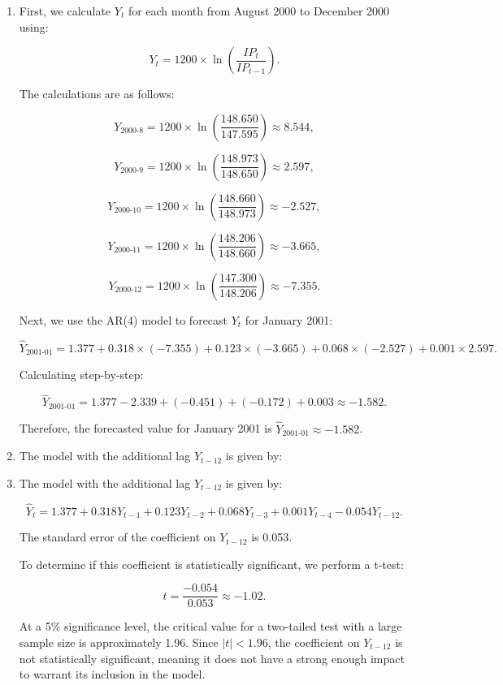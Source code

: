 \documentclass[12pt]{article}
\begin{document}
\begin{enumerate}
{\begin{enumerate}
    \item  First, we calculate \( Y_t \) for each month from August 2000 to December 2000 using:

    \[
    Y_t = 1200 \times \ln\left(\frac{IP_t}{IP_{t-1}}\right).
    \]

    The calculations are as follows:

    \[
    Y_{\text{2000-8}} = 1200 \times \ln\left(\frac{148.650}{147.595}\right) \approx 8.544,
    \]

    \[
    Y_{\text{2000-9}} = 1200 \times \ln\left(\frac{148.973}{148.650}\right) \approx 2.597,
    \]

    \[
    Y_{\text{2000-10}} = 1200 \times \ln\left(\frac{148.660}{148.973}\right) \approx -2.527,
    \]

    \[
    Y_{\text{2000-11}} = 1200 \times \ln\left(\frac{148.206}{148.660}\right) \approx -3.665,
    \]

    \[
    Y_{\text{2000-12}} = 1200 \times \ln\left(\frac{147.300}{148.206}\right) \approx -7.355.
    \]

    Next, we use the AR(4) model to forecast \( Y_t \) for January 2001:

    \[
    \hat{Y}_{\text{2001-01}} = 1.377 + 0.318 \times (-7.355) + 0.123 \times (-3.665) + 0.068 \times (-2.527) + 0.001 \times 2.597.
    \]

    Calculating step-by-step:

    \[
    \hat{Y}_{\text{2001-01}} = 1.377 - 2.339 + (-0.451) + (-0.172) + 0.003 \approx -1.582.
    \]

    Therefore, the forecasted value for January 2001 is \( \hat{Y}_{\text{2001-01}} \approx -1.582 \).

    \item The model with the additional lag \( Y_{t-12} \) is given by:


\item  The model with the additional lag \( Y_{t-12} \) is given by:

    \[
    \hat{Y}_t = 1.377 + 0.318 Y_{t-1} + 0.123 Y_{t-2} + 0.068 Y_{t-3} + 0.001 Y_{t-4} - 0.054 Y_{t-12}.
    \]

    The standard error of the coefficient on \( Y_{t-12} \) is 0.053.

    To determine if this coefficient is statistically significant, we perform a t-test:

    \[
    t = \frac{-0.054}{0.053} \approx -1.02.
    \]

    At a 5\% significance level, the critical value for a two-tailed test with a large sample size is approximately 1.96. Since \( |t| < 1.96 \), the coefficient on \( Y_{t-12} \) is not statistically significant, meaning it does not have a strong enough impact to warrant its inclusion in the model.

\end{enumerate}
}




\end{enumerate}
\end{document}
